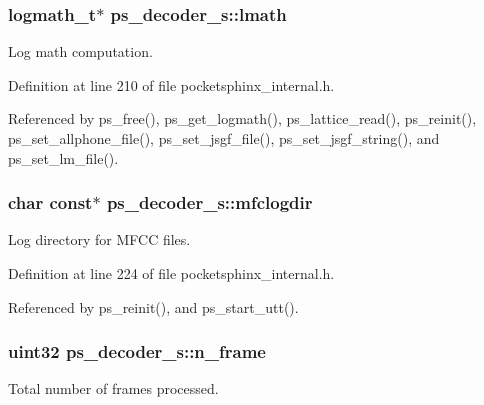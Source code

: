 \subsubsection[{lmath}]{\setlength{\rightskip}{0pt plus 5cm}logmath\+\_\+t$\ast$ ps\+\_\+decoder\+\_\+s\+::lmath}\label{structps__decoder__s_abd17fe329f2fb219c5a534f3217c5b95}


Log math computation. 



Definition at line 210 of file pocketsphinx\+\_\+internal.\+h.



Referenced by ps\+\_\+free(), ps\+\_\+get\+\_\+logmath(), ps\+\_\+lattice\+\_\+read(), ps\+\_\+reinit(), ps\+\_\+set\+\_\+allphone\+\_\+file(), ps\+\_\+set\+\_\+jsgf\+\_\+file(), ps\+\_\+set\+\_\+jsgf\+\_\+string(), and ps\+\_\+set\+\_\+lm\+\_\+file().

\subsubsection[{mfclogdir}]{\setlength{\rightskip}{0pt plus 5cm}char const$\ast$ ps\+\_\+decoder\+\_\+s\+::mfclogdir}\label{structps__decoder__s_a8bb5ef8791798b8dd9bc82b1ec016663}


Log directory for M\+F\+C\+C files. 



Definition at line 224 of file pocketsphinx\+\_\+internal.\+h.



Referenced by ps\+\_\+reinit(), and ps\+\_\+start\+\_\+utt().

\subsubsection[{n\+\_\+frame}]{\setlength{\rightskip}{0pt plus 5cm}uint32 ps\+\_\+decoder\+\_\+s\+::n\+\_\+frame}\label{structps__decoder__s_a2886b321c576c7def449ebb2f37899fd}


Total number of frames processed. 




